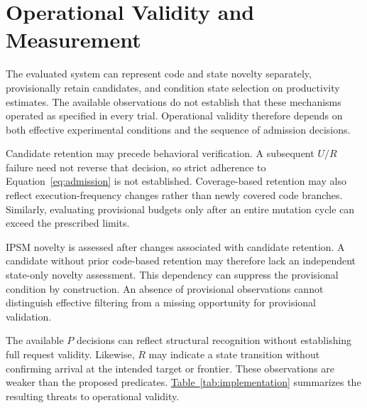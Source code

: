 \documentclass[final,5p,times,number]{elsarticle}
\newcommand{\namedref}[2]{\hyperref[#2]{#1~\ref*{#2}}}
\begin{document}
\section{Operational Validity and Measurement}
\label{sec:implementation}
The evaluated system can represent code and state novelty separately, provisionally retain candidates, and condition state selection on productivity estimates. The available observations do not establish that these mechanisms operated as specified in every trial. Operational validity therefore depends on both effective experimental conditions and the sequence of admission decisions.

Candidate retention may precede behavioral verification. A subsequent $U/R$ failure need not reverse that decision, so strict adherence to Equation~\ref{eq:admission} is not established. Coverage-based retention may also reflect execution-frequency changes rather than newly covered code branches. Similarly, evaluating provisional budgets only after an entire mutation cycle can exceed the prescribed limits.

IPSM novelty is assessed after changes associated with candidate retention. A candidate without prior code-based retention may therefore lack an independent state-only novelty assessment. This dependency can suppress the provisional condition by construction. An absence of provisional observations cannot distinguish effective filtering from a missing opportunity for provisional validation.

The available $P$ decisions can reflect structural recognition without establishing full request validity. Likewise, $R$ may indicate a state transition without confirming arrival at the intended target or frontier. These observations are weaker than the proposed predicates. \namedref{Table}{tab:implementation} summarizes the resulting threats to operational validity.
\end{document}
